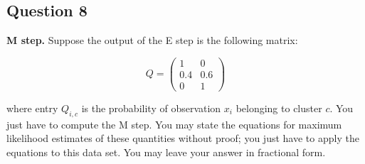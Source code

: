 \documentclass{article}
\begin{document}
\subsection*{Question 8}
\textbf{M step.} Suppose the output of the E step is the following matrix:

\[ Q = \left( \begin{array}{cc}
1 & 0 \\
0.4 & 0.6 \\
0 & 1 \end{array} \right)\] 

where entry $Q_{i,c}$ is the probability of observation $x_i$ belonging to cluster $c$. You just have to compute the M step. You may state the equations for maximum likelihood estimates of these quantities without proof; you just have to apply the equations to this data set. You may leave your answer in fractional form.
\end{document}
